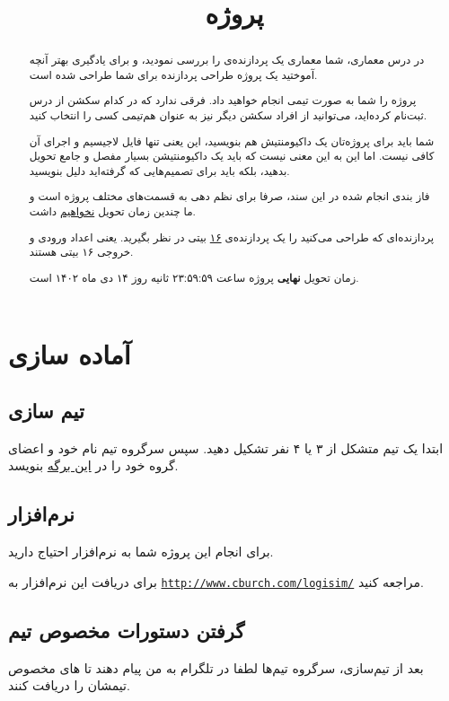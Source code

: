 \documentclass[11pt, dvipsnames, svgnames, x11names]{article}
\title{پروژه}
\date{}
\begin{document}
\maketitle    
\tableofcontents

\begin{abstract}
در درس معماری، شما معماری یک پردازنده‌ی 
را بررسی نمودید، و برای یادگیری بهتر آنچه آموختید یک پروژه طراحی پردازنده برای شما طراحی شده است.

پروژه را شما به صورت تیمی انجام خواهید داد. فرقی ندارد که در کدام سکشن از درس ثبت‌نام کرده‌اید، می‌توانید از افراد سکشن دیگر نیز به عنوان هم‌تیمی کسی را انتخاب کنید.

شما باید برای پروژه‌تان یک داکیومنتیش هم بنویسید، این یعنی تنها فایل لاجیسیم و اجرای آن کافی نیست. اما این به این معنی نیست که باید یک داکیومنتیشن بسیار مفصل و جامع تحویل بدهید، بلکه باید برای تصمیم‌هایی که گرفته‌اید دلیل بنویسید.

فاز بندی انجام شده در این سند، صرفا برای نظم دهی به قسمت‌های مختلف پروژه است و ما چندین زمان تحویل \underline{نخواهیم} داشت.

پردازنده‌ای که طراحی می‌کنید را یک پردازنده‌ی \underline{۱۶} بیتی در نظر بگیرید. یعنی اعداد ورودی و خروجی ۱۶ بیتی هستند.

زمان تحویل \textbf{نهایی} پروژه ساعت ۲۳:۵۹:۵۹ ثانیه روز ۱۴ دی ماه ۱۴۰۲ است.
\end{abstract}

\newpage
\section{آماده سازی}
\subsection{تیم سازی}
ابتدا یک تیم متشکل از ۳ یا ۴ نفر تشکیل دهید. سپس سرگروه تیم نام خود و اعضای گروه خود را در \href{https://docs.google.com/spreadsheets/d/1Abn-jLsgmaDNbdNiK79yFFMcXp9WaEA_Rby0RCvrBUw/edit#gid=0}{این برگه}
 بنویسد.

\subsection{نرم‌افزار}
برای انجام این پروژه شما به نرم‌افزار 
احتیاج دارید.

برای دریافت این نرم‌افزار به \href{http://www.cburch.com/logisim/}{\texttt{http://www.cburch.com/logisim/}}
مراجعه کنید.

\subsection{گرفتن دستورات مخصوص تیم}
بعد از تیم‌سازی، سرگروه تیم‌ها لطفا در تلگرام به من
پیام دهند تا های مخصوص تیمشان را دریافت کنند.
\end{document}
